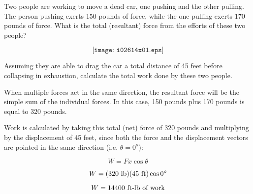 

Two people are working to move a dead car, one pushing and the other pulling.  The person pushing exerts 150 pounds of force, while the one pulling exerts 170 pounds of force.  What is the total (resultant) force from the efforts of these two people?

$$\texttt{[image: i02614x01.eps]}$$

Assuming they are able to drag the car a total distance of 45 feet before collapsing in exhaustion, calculate the total work done by these two people.







When multiple forces act in the same direction, the resultant force will be the simple sum of the individual forces.  In this case, 150 pounds plus 170 pounds is equal to 320 pounds.

\vskip 10pt

Work is calculated by taking this total (net) force of 320 pounds and multiplying by the displacement of 45 feet, since both the force and the displacement vectors are pointed in the same direction (i.e. $\theta = 0^o$):

$$W = F x \cos \theta$$

$$W = (320 \hbox{ lb}) (45 \hbox{ ft}) \cos 0^o$$

$$W = 14400 \hbox{ ft-lb of work}$$












